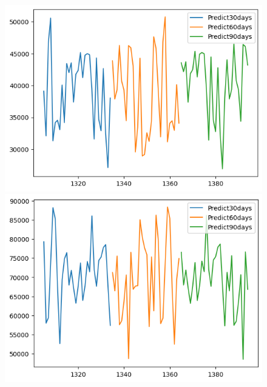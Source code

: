 \begin{figure}[H]
\begin{minipage}{0.15\textwidth}
    \end{minipage}
    \hfill
        \begin{minipage}{0.15\textwidth}
    \centering
    \includegraphics[width=1\textwidth]{resources/chapter-5/newdata1/predicted/BIDV_ML_9_1_30days.png}
    \end{minipage}
    \hfill
    \begin{minipage}{0.15\textwidth}
    \centering
    \includegraphics[width=1\textwidth]{resources/chapter-5/newdata1/predicted/VCB_ML_7_3_30days.png}
    \end{minipage}
    \hfill
    \begin{minipage}{0.15\textwidth}
    \centering

\end{minipage}
\end{figure}
